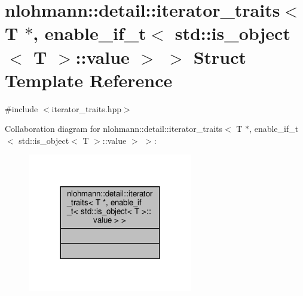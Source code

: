\hypertarget{structnlohmann_1_1detail_1_1iterator__traits_3_01_t_01_5_00_01enable__if__t_3_01std_1_1is__objec8d960665487688165530972cda4f1bea}{}\section{nlohmann\+:\+:detail\+:\+:iterator\+\_\+traits$<$ T $\ast$, enable\+\_\+if\+\_\+t$<$ std\+:\+:is\+\_\+object$<$ T $>$\+:\+:value $>$ $>$ Struct Template Reference}
\label{structnlohmann_1_1detail_1_1iterator__traits_3_01_t_01_5_00_01enable__if__t_3_01std_1_1is__objec8d960665487688165530972cda4f1bea}


{\ttfamily \#include $<$iterator\+\_\+traits.\+hpp$>$}



Collaboration diagram for nlohmann\+:\+:detail\+:\+:iterator\+\_\+traits$<$ T $\ast$, enable\+\_\+if\+\_\+t$<$ std\+:\+:is\+\_\+object$<$ T $>$\+:\+:value $>$ $>$\+:\nopagebreak
\begin{figure}[H]
\begin{center}
\leavevmode
\includegraphics[width=204pt]{structnlohmann_1_1detail_1_1iterator__traits_3_01_t_01_5_00_01enable__if__t_3_01std_1_1is__objecb8bc202ff6c675c946f5cefca7cd588b}
\end{center}
\end{figure}
